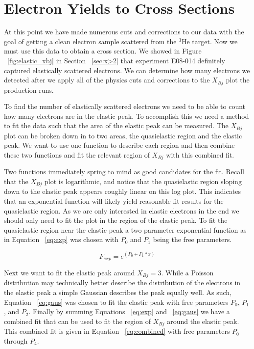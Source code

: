 \section{Electron Yields to Cross Sections}
\label{sec:yield}

At this point we have made numerous cuts and corrections to our data with the goal of getting a clean electron sample scattered from the $^3$He target. Now we must use this data to obtain a cross section. We showed in Figure ~\ref{fig:elastic_xbj} in Section ~\ref{sec:x>2} that experiment E08-014 definitely captured elastically scattered electrons. We can determine how many electrons we detected after we apply all of the physics cuts and corrections to the $X_{Bj}$ plot the production runs.

To find the number of elastically scattered electrons we need to be able to count how many electrons are in the elastic peak. To accomplish this we need a method to fit the data such that the area of the elastic peak can be measured. The $X_{Bj}$ plot can be broken down in to two areas, the quasielastic region and the elastic peak. We want to use one function to describe each region and then combine these two functions and fit the relevant region of $X_{Bj}$ with this combined fit. 

Two functions immediately spring to mind as good candidates for the fit. Recall that the $X_{Bj}$ plot is logarithmic, and notice that the quasielastic region sloping down to the elastic peak appears roughly linear on this log plot. This indicates that an exponential function will likely yield reasonable fit results for the quasielastic region. As we are only interested in elastic electrons in the end we should only need to fit the plot in the region of the elastic peak. To fit the quasielastic region near the elastic peak a two parameter exponential function as in Equation ~\ref{eq:exp} was chosen with $P_0$ and $P_1$ being the free parameters.

\begin{equation} \label{eq:exp}
	F_{exp} = e^{\left( P_0+P_1*x \right)}
\end{equation}

Next we want to fit the elastic peak around $X_{Bj}=3$. While a Poisson distribution may technically better describe the distribution of the electrons in the elastic peak a simple Gaussian describes the peak equally well. As such, Equation ~\ref{eq:gaus} was chosen to fit the elastic peak with free parameters $P_0$, $P_1$, and $P_2$. Finally by summing Equations ~\ref{eq:exp} and ~\ref{eq:gaus} we have a combined fit that can be used to fit the region of $X_{Bj}$ around the elastic peak. This combined fit is given in Equation ~\ref{eq:combined} with free parameters $P_0$ through $P_4$.

